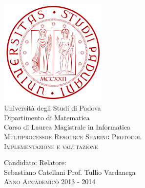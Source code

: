 \documentclass[11pt,a4paper,twoside]{book}
\begin{document}
\setcounter{page}{3}
\begin{center}
\  \\  %




\includegraphics{images/unipd-logo.png}\\[0.7cm]
{\LARGE Università degli Studi di Padova}\\[0.4cm]
{\Large Dipartimento di Matematica}\\[0.4cm]
{\Large Corso di Laurea Magistrale in Informatica}\\[0.4cm]

\vspace{13 mm}
\textsc{\Large Multiprocessor Resource Sharing Protocol}\\[0.8cm]
\textsc{\large Implementazione e valutazione}\\[0.3cm]

\vspace{18 mm}

\begin{normalsize}
\noindent Candidato: \hfill Relatore:\\
\noindent Sebastiano Catellani \hfill Prof. Tullio Vardanega\\\vspace{0.5cm}
\vspace{19 mm}
\textsc{\small Anno Accademico 2013 - 2014}
\end{normalsize}
\end{center}
\pagebreak

\cleardoublepage


\lhead{}
\end{document}
